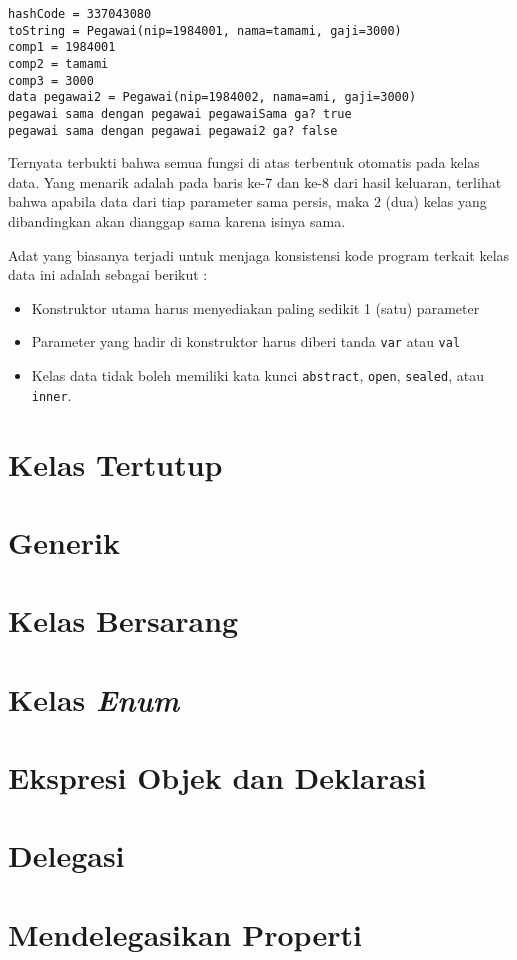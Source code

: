 \begin{lstlisting}
hashCode = 337043080
toString = Pegawai(nip=1984001, nama=tamami, gaji=3000)
comp1 = 1984001
comp2 = tamami
comp3 = 3000
data pegawai2 = Pegawai(nip=1984002, nama=ami, gaji=3000)
pegawai sama dengan pegawai pegawaiSama ga? true
pegawai sama dengan pegawai pegawai2 ga? false
\end{lstlisting}

Ternyata terbukti bahwa semua fungsi di atas terbentuk otomatis pada kelas data. Yang menarik adalah pada baris ke-7 dan ke-8 dari hasil keluaran, terlihat bahwa apabila data dari tiap parameter sama persis, maka 2 (dua) kelas yang dibandingkan akan dianggap sama karena isinya sama.

Adat yang biasanya terjadi untuk menjaga konsistensi kode program terkait kelas data ini adalah sebagai berikut : 

\begin{itemize}
	\item Konstruktor utama harus menyediakan paling sedikit 1 (satu) parameter
	\item Parameter yang hadir di konstruktor harus diberi tanda \texttt{var} atau \texttt{val}
	\item Kelas data tidak boleh memiliki kata kunci \texttt{abstract}, \texttt{open}, \texttt{sealed}, atau \texttt{inner}.
\end{itemize}

\section{Kelas Tertutup}

\section{Generik}

\section{Kelas Bersarang}

\section{Kelas \textit{Enum}}

\section{Ekspresi Objek dan Deklarasi}

\section{Delegasi}

\section{Mendelegasikan Properti}
